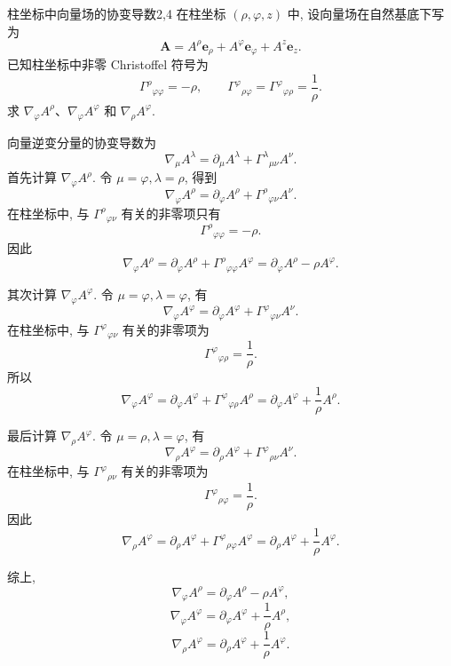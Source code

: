 \begin{example}{柱坐标中向量场的协变导数}{2,4}
	在柱坐标 $(\rho,\varphi,z)$ 中, 设向量场在自然基底下写为
	\[
	\bm{A}
	=
	A^{\rho}\bm{e}_{\rho}
	+
	A^{\varphi}\bm{e}_{\varphi}
	+
	A^{z}\bm{e}_{z}.
	\]
	已知柱坐标中非零 Christoffel 符号为
	\[
	\Gamma^{\rho}{}_{\varphi\varphi}
	=
	-\rho,
	\qquad
	\Gamma^{\varphi}{}_{\rho\varphi}
	=
	\Gamma^{\varphi}{}_{\varphi\rho}
	=
	\frac{1}{\rho}.
	\]
	求 $\nabla_{\varphi}A^{\rho}$、$\nabla_{\varphi}A^{\varphi}$ 和 $\nabla_{\rho}A^{\varphi}$. 
	\begin{solution}
		向量逆变分量的协变导数为
		\[
		\nabla_{\mu}A^{\lambda}
		=
		\partial_{\mu}A^{\lambda}
		+
		\Gamma^{\lambda}{}_{\mu\nu}A^{\nu}.
		\]
		首先计算 $\nabla_{\varphi}A^{\rho}$. 令 $\mu=\varphi,\lambda=\rho$, 得到
		\[
		\nabla_{\varphi}A^{\rho}
		=
		\partial_{\varphi}A^{\rho}
		+
		\Gamma^{\rho}{}_{\varphi\nu}A^{\nu}.
		\]
		在柱坐标中, 与 $\Gamma^{\rho}{}_{\varphi\nu}$ 有关的非零项只有
		\[
		\Gamma^{\rho}{}_{\varphi\varphi}
		=
		-\rho.
		\]
		因此
		\[
		\nabla_{\varphi}A^{\rho}
		=
		\partial_{\varphi}A^{\rho}
		+
		\Gamma^{\rho}{}_{\varphi\varphi}A^{\varphi}
		=
		\partial_{\varphi}A^{\rho}
		-
		\rho A^{\varphi}.
		\]
		
		其次计算 $\nabla_{\varphi}A^{\varphi}$. 令 $\mu=\varphi,\lambda=\varphi$, 有
		\[
		\nabla_{\varphi}A^{\varphi}
		=
		\partial_{\varphi}A^{\varphi}
		+
		\Gamma^{\varphi}{}_{\varphi\nu}A^{\nu}.
		\]
		在柱坐标中, 与 $\Gamma^{\varphi}{}_{\varphi\nu}$ 有关的非零项为
		\[
		\Gamma^{\varphi}{}_{\varphi\rho}
		=
		\frac{1}{\rho}.
		\]
		所以
		\[
		\nabla_{\varphi}A^{\varphi}
		=
		\partial_{\varphi}A^{\varphi}
		+
		\Gamma^{\varphi}{}_{\varphi\rho}A^{\rho}
		=
		\partial_{\varphi}A^{\varphi}
		+
		\frac{1}{\rho}A^{\rho}.
		\]
		
		最后计算 $\nabla_{\rho}A^{\varphi}$. 令 $\mu=\rho,\lambda=\varphi$, 有
		\[
		\nabla_{\rho}A^{\varphi}
		=
		\partial_{\rho}A^{\varphi}
		+
		\Gamma^{\varphi}{}_{\rho\nu}A^{\nu}.
		\]
		在柱坐标中, 与 $\Gamma^{\varphi}{}_{\rho\nu}$ 有关的非零项为
		\[
		\Gamma^{\varphi}{}_{\rho\varphi}
		=
		\frac{1}{\rho}.
		\]
		因此
		\[
		\nabla_{\rho}A^{\varphi}
		=
		\partial_{\rho}A^{\varphi}
		+
		\Gamma^{\varphi}{}_{\rho\varphi}A^{\varphi}
		=
		\partial_{\rho}A^{\varphi}
		+
		\frac{1}{\rho}A^{\varphi}.
		\]
		
		综上, 
		\[
		\nabla_{\varphi}A^{\rho}
		=
		\partial_{\varphi}A^{\rho}
		-
		\rho A^{\varphi},
		\]
		\[
		\nabla_{\varphi}A^{\varphi}
		=
		\partial_{\varphi}A^{\varphi}
		+
		\frac{1}{\rho}A^{\rho},
		\]
		\[
		\nabla_{\rho}A^{\varphi}
		=
		\partial_{\rho}A^{\varphi}
		+
		\frac{1}{\rho}A^{\varphi}.
		\]
	\end{solution}
\end{example}

